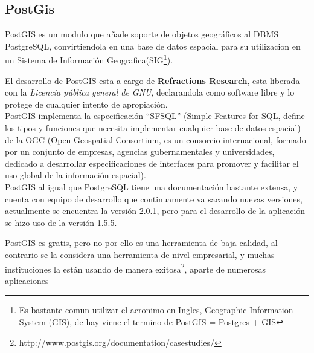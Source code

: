 

    \subsection{PostGis} %
    \label{sec:postgis}

      PostGIS es un modulo  que a\~nade soporte de objetos geográficos al DBMS PostgreSQL, convirtiendola en una base de datos espacial para su utilizacion en un Sistema de Informaci\'on Geografica(SIG\footnote{ Es bastante comun utilizar el acronimo en Ingles, Geographic Information System (GIS), de hay viene el termino de PostGIS = Postgres + GIS}).

      El desarrollo de PostGIS esta a cargo de \textbf{Refractions Research}, esta liberada con la \emph{Licencia pública general de GNU}, declarandola como software libre y lo protege de cualquier intento de apropiaci\'on.\\

      PostGIS implementa la especificaci\'on ``SFSQL'' (Simple Features for SQL, define los tipos y funciones que necesita implementar cualquier base de datos espacial) de la OGC (Open Geospatial Consortium, es un consorcio internacional, formado por un conjunto de empresas, agencias gubernamentales y universidades, dedicado a desarrollar especificaciones de interfaces para promover y facilitar el uso global de la información espacial).\\

      PostGIS al igual que PostgreSQL tiene una documentaci\'on bastante extensa, y cuenta con equipo de desarrollo que continuamente va sacando nuevas versiones, actualmente se encuentra la versi\'on 2.0.1, pero para el desarrollo de la aplicaci\'on se hizo uso de la versi\'on 1.5.5.

      PostGIS es gratis, pero no por ello es una herramienta de baja calidad, al contrario se la considera una herramienta de nivel empresarial, y muchas instituciones la est\'an usando de manera exitosa\footnote{ http://www.postgis.org/documentation/casestudies/}, aparte de numerosas aplicaciones \\

